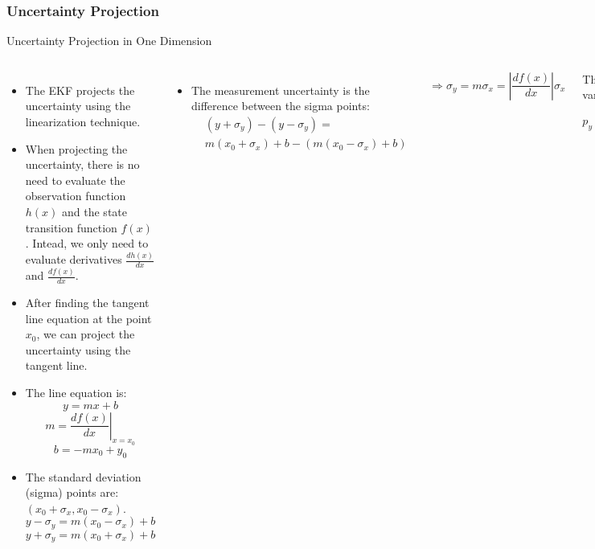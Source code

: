\subsubsection{Uncertainty Projection}
\begin{frame}{Uncertainty Projection in One Dimension}

\begin{columns}
\begin{itemize}
    \item The EKF projects the uncertainty using the linearization technique.

    \item When projecting the uncertainty, there is no need to evaluate the observation function $h(x)$ and the state transition function $f(x)$. Intead, we only need to evaluate derivatives $\frac{dh(x)}{dx}$ and $\frac{df(x)}{dx}$.

    \item After finding the tangent line equation at the point $x_0$, we can project the uncertainty using the tangent line.

    \item The line equation is:
    \vspace{-8pt}
    \[
    y = mx + b
    \]
    \[
    m = \left. \frac{df(x)}{dx} \right|_{x = x_0}
    \]
    \[
    b = -mx_0 + y_0
    \]
    \item The standard deviation (sigma) points are: $(x_0 + \sigma_x, x_0 - \sigma_x)$.
    \vspace{-8pt}
    \[
    y - \sigma_y = m(x_0 - \sigma_x) + b
    \]
    \[
    y + \sigma_y = m(x_0 + \sigma_x) + b
    \]
\end{itemize}

\begin{itemize}
    \item The measurement uncertainty is the difference between the sigma points:
\begin{align*}
    & (y + \sigma_y)  - (y - \sigma_y) = \\
    & m(x_0 + \sigma_x) + b - (m(x_0 - \sigma_x) + b)
\end{align*}
\end{itemize}


\[
\Rightarrow \sigma_y = m\sigma_x = \left| \frac{df(x)}{dx} \right| \sigma_x
\]

The estimation variance: $p_x = \sigma_x^2$ 
\[
p_y = \left| \frac{df(x)}{dx} \right|^2 p_x
\]

\end{columns}
\end{frame}


